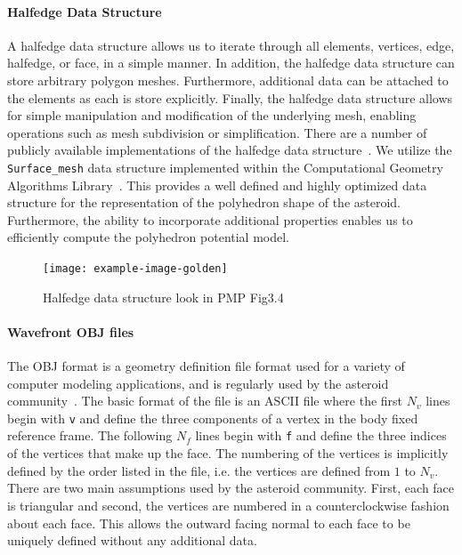 \paragraph{Halfedge Data Structure}\label{sec:halfedge_data_structure}
A halfedge data structure allows us to iterate through all elements, vertices, edge, halfedge, or face, in a simple manner.
In addition, the halfedge data structure can store arbitrary polygon meshes.
Furthermore, additional data can be attached to the elements as each is store explicitly.
Finally, the halfedge data structure allows for simple manipulation and modification of the underlying mesh, enabling operations such as mesh subdivision or simplification.
There are a number of publicly available implementations of the halfedge data structure~\cite{cgalproject2018,botsch2002}.
We utilize the \texttt{Surface\_mesh} data structure implemented within the Computational Geometry Algorithms Library~\cite{sieger2011}.
This provides a well defined and highly optimized data structure for the representation of the polyhedron shape of the asteroid.
Furthermore, the ability to incorporate additional properties enables us to efficiently compute the polyhedron potential model.
\begin{figure}
    \centering
    \texttt{[image: example-image-golden]}
    \caption{Halfedge data structure look in PMP Fig3.4~\label{fig:halfedge_data_structure}}
\end{figure}


\paragraph{Wavefront OBJ files}
The OBJ format is a geometry definition file format used for a variety of computer modeling applications, and is regularly used by the asteroid community~\cite{neese2004}.
The basic format of the file is an ASCII file where the first \( N_v\) lines begin with \texttt{v} and define the three components of a vertex in the body fixed reference frame.
The following \( N_f\) lines begin with \texttt{f} and define the three indices of the vertices that make up the face.
The numbering of the vertices is implicitly defined by the order listed in the file, i.e. the vertices are defined from \( 1 \) to \( N_v\).
There are two main assumptions used by the asteroid community.
First, each face is triangular and second, the vertices are numbered in a counterclockwise fashion about each face.
This allows the outward facing normal to each face to be uniquely defined without any additional data.

